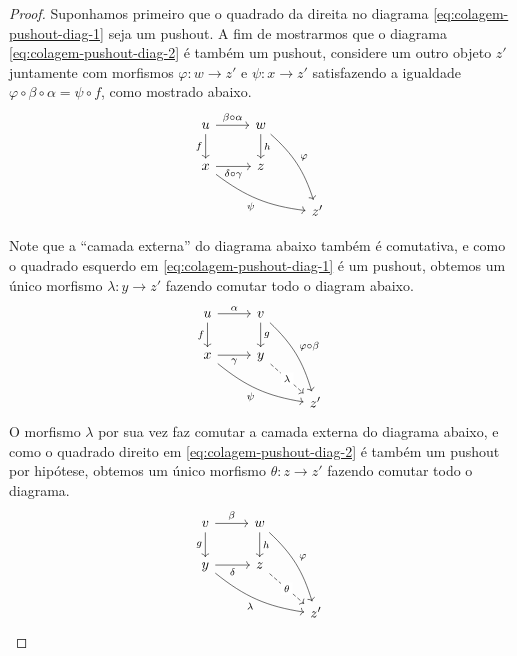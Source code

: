  \begin{proof}
   Suponhamos primeiro que o quadrado da direita no diagrama \eqref{eq:colagem-pushout-diag-1} seja um pushout.
   A fim de mostrarmos que o diagrama \eqref{eq:colagem-pushout-diag-2} é também um pushout, considere um outro objeto $z'$ juntamente com morfismos $\varphi: w \to z'$ e $\psi: x \to z'$ satisfazendo a igualdade $\varphi \circ \beta \circ \alpha = \psi \circ f$, como mostrado abaixo.
   \begin{displaymath}
     \begin{tikzcd}
        u
       \arrow[r, "\beta \circ \alpha"]
       \arrow[d, "f" swap]
       & w
       \arrow[d, "h"]
       \arrow[rdd, bend left=15, "\varphi"]
       \\ x
       \arrow[r, "\delta \circ \gamma" swap]
       \arrow[rrd, bend right=15, "\psi" swap]
       & z
       \\ & & z'
     \end{tikzcd}
   \end{displaymath}

   Note que a ``camada externa'' do diagrama abaixo também é comutativa, e como o quadrado esquerdo em \eqref{eq:colagem-pushout-diag-1} é um pushout, obtemos um único morfismo $\lambda: y \to z'$ fazendo comutar todo o diagram abaixo.
   \begin{displaymath}
     \begin{tikzcd}
       u
       \arrow[r, "\alpha"]
       \arrow[d, "f" swap]
       & v
       \arrow[d, "g"]
       \arrow[rdd, bend left=15, "\varphi \circ \beta"]
       \\ x
       \arrow[r, "\gamma" swap]
       \arrow[rrd, bend right=15, "\psi" swap]
       & y
       \arrow[rd, dashed, "\lambda" description]
       \\ & & z'
     \end{tikzcd}
   \end{displaymath}
   O morfismo $\lambda$ por sua vez faz comutar a camada externa do diagrama abaixo, e como o quadrado direito em \eqref{eq:colagem-pushout-diag-2} é também um pushout por hipótese, obtemos um único morfismo $\theta: z \to z'$ fazendo comutar todo o diagrama.
   \begin{displaymath}
     \begin{tikzcd}
       v
       \arrow[r, "\beta"]
       \arrow[d, "g" swap]
       & w
       \arrow[rdd, bend left=15, "\varphi"]
       \arrow[d, "h"]
       \\ y
       \arrow[r, "\delta" swap]
       \arrow[rrd, bend right=15, "\lambda" swap]
       & z
       \arrow[rd, dashed, "\theta" description]
       \\ & & z'
     \end{tikzcd}
   \end{displaymath}


\end{proof}
